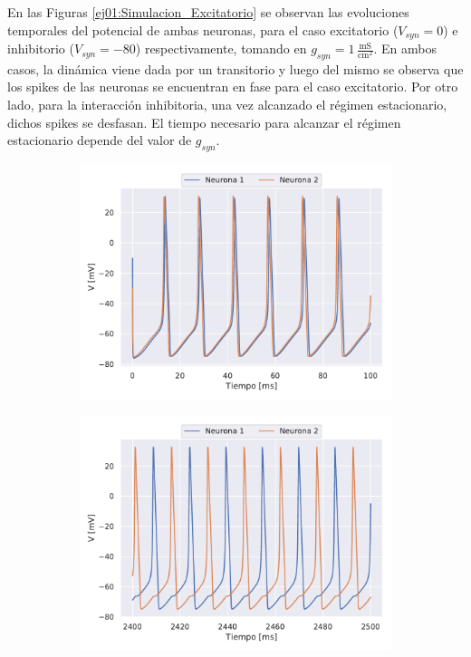 En las Figuras \ref{ej01:Simulacion_Excitatorio} se observan las evoluciones temporales del potencial de ambas neuronas, para el caso excitatorio ($V_{syn}=0$) e inhibitorio ($V_{syn}=-80$) respectivamente, tomando en $g_{syn} = 1\,\frac{\text{mS}}{\text{cm}^2}$. En ambos casos, la dinámica viene dada por un transitorio y luego del mismo se observa que los spikes de las neuronas se encuentran en fase para el caso excitatorio. Por otro lado, para la interacción inhibitoria, una vez alcanzado el régimen estacionario, dichos spikes se desfasan. El tiempo necesario para alcanzar el régimen estacionario depende del valor de $g_{syn}$.



\begin{figure}[h!]
    \centering
    \begin{subfigure}[b]{0.48\textwidth}
        \includegraphics[width=\textwidth]{Inhibitorio_inicio.pdf}
        \caption{}
        \label{Simulacion_Inhibitorio_inicio}
    \end{subfigure}
    \hfill
    \begin{subfigure}[b]{0.48\textwidth}
        \includegraphics[width=\textwidth]{Inhibitorio_final.pdf}

\end{subfigure}
\end{figure}
